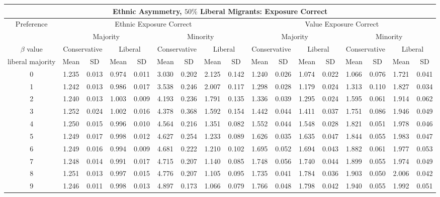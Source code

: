 \documentclass{article}
\begin{document}
\begin{table}[H]
{\begin{tabular}{|c|c|c|c|c|c|c|c|c|c|c|c|c|c|c|c|c|}
 
  \multicolumn{17}{|c|}{Ethnic Asymmetry, $50 \%$ Liberal Migrants: Exposure Correct}  \\\hline
 Preference &  \multicolumn{8}{|c|}{Ethnic Exposure Correct} & \multicolumn{8}{|c|}{Value Exposure Correct}   \\\hline
 & \multicolumn{4}{|c|}{Majority} & \multicolumn{4}{|c|}{Minority}  & \multicolumn{4}{|c|}{Majority} & \multicolumn{4}{|c|}{Minority}  \\
 $\beta$ value & \multicolumn{2}{|c|}{Conservative} & \multicolumn{2}{|c|}{Liberal} 
& \multicolumn{2}{|c|}{Conservative} & \multicolumn{2}{|c|}{Liberal} & \multicolumn{2}{|c|}{Conservative} & \multicolumn{2}{|c|}{Liberal} 
& \multicolumn{2}{|c|}{Conservative} & \multicolumn{2}{|c|}{Liberal}\\
 liberal majority & Mean & SD & Mean & SD & Mean & SD & Mean & SD & Mean & SD & Mean & SD & Mean & SD & Mean & SD\\
 \hline
   0 & 1.235 & 0.013 & 0.974 & 0.011 & 3.030 & 0.202 & 2.125 & 0.142 & 1.240 & 0.026 & 1.074 & 0.022 & 1.066 & 0.076 & 1.721 & 0.041 \\ 
     1 & 1.242 & 0.013 & 0.986 & 0.017 & 3.538 & 0.246 & 2.007 & 0.117 & 1.298 & 0.028 & 1.179 & 0.024 & 1.313 & 0.110 & 1.827 & 0.034 \\ 
     2 & 1.240 & 0.013 & 1.003 & 0.009 & 4.193 & 0.236 & 1.791 & 0.135 & 1.336 & 0.039 & 1.295 & 0.024 & 1.595 & 0.061 & 1.914 & 0.062 \\ 
     3 & 1.252 & 0.024 & 1.002 & 0.016 & 4.378 & 0.368 & 1.592 & 0.154 & 1.442 & 0.044 & 1.411 & 0.037 & 1.751 & 0.086 & 1.946 & 0.049 \\ 
     4 & 1.250 & 0.015 & 0.996 & 0.010 & 4.564 & 0.216 & 1.351 & 0.082 & 1.552 & 0.044 & 1.548 & 0.028 & 1.821 & 0.051 & 1.978 & 0.046 \\ 
     5 & 1.249 & 0.017 & 0.998 & 0.012 & 4.627 & 0.254 & 1.233 & 0.089 & 1.626 & 0.035 & 1.635 & 0.047 & 1.844 & 0.055 & 1.983 & 0.047 \\ 
     6 & 1.249 & 0.016 & 0.994 & 0.009 & 4.681 & 0.222 & 1.210 & 0.102 & 1.695 & 0.052 & 1.694 & 0.043 & 1.882 & 0.061 & 1.977 & 0.053 \\ 
     7 & 1.248 & 0.014 & 0.991 & 0.017 & 4.715 & 0.207 & 1.140 & 0.085 & 1.748 & 0.056 & 1.740 & 0.044 & 1.899 & 0.055 & 1.974 & 0.049 \\ 
     8 & 1.251 & 0.013 & 0.997 & 0.015 & 4.776 & 0.207 & 1.105 & 0.095 & 1.735 & 0.041 & 1.784 & 0.036 & 1.903 & 0.050 & 2.006 & 0.042 \\ 
     9 & 1.246 & 0.011 & 0.998 & 0.013 & 4.897 & 0.173 & 1.066 & 0.079 & 1.766 & 0.048 & 1.798 & 0.042 & 1.940 & 0.055 & 1.992 & 0.051 \\ 

\end{tabular}}
\end{table}
\end{document}
